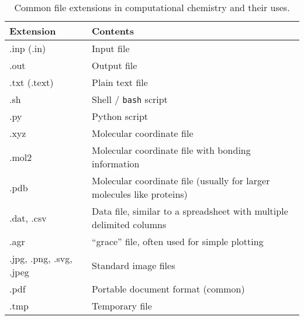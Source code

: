     \begin{table}[h]
        \centering
        \caption{Common file extensions in computational chemistry and their uses.}
        \renewcommand{\arraystretch}{1.25}
        \begin{tabularx}{\textwidth}{>{\ttfamily}l X}
          \toprule
          \textbf{\rmfamily Extension} & \textbf{Contents}                                                      \\ \midrule
          .inp (.in)                   & Input file                                                             \\
          .out                         & Output file                                                            \\
          .txt (.text)                 & Plain text file                                                        \\
          .sh                          & Shell / \texttt{bash} script                                                      \\
          .py                          & Python script                                                          \\
          .xyz                         & Molecular coordinate file                                              \\
          .mol2                        & Molecular coordinate file with bonding information                     \\
          .pdb                         & Molecular coordinate file (usually for larger molecules like proteins) \\
          .dat, .csv                   & Data file, similar to a spreadsheet with multiple delimited columns    \\
          .agr                         & \enquote{grace} file, often used for simple plotting                         \\
          .jpg, .png, .svg, .jpeg      & Standard image files                                                   \\
          .pdf                         & Portable document format (common)                                      \\
          .tmp                         & Temporary file                                                         \\ \bottomrule
        \end{tabularx}
        \label{tab:commonexts}
    \end{table}

